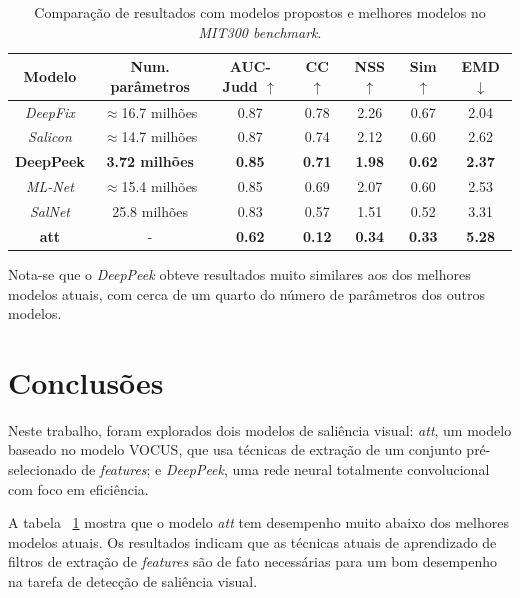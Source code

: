 \documentclass[11pt]{article}
\newcommand{\tit}[1]{\textit{#1}}
\begin{document}
\begin{table}[!htb]
	\small
    \centering
    \label{table:results}
    \caption{Comparação de resultados com modelos propostos e melhores
        modelos no \emph{MIT300 benchmark}.}
    \begin{tabular}{|c|c|c|c|c|c|c|}
        \hline
        Modelo & Num. parâmetros & AUC-Judd $\uparrow$ & CC $\uparrow$
            & NSS $\uparrow$ & Sim $\uparrow$ & EMD $\downarrow$\\
        \hline
        \emph{DeepFix} & $\approx$16.7 milhões & 0.87 & 0.78
            & 2.26 & 0.67 & 2.04\\
        \hline
        \emph{Salicon} & $\approx$14.7 milhões & 0.87 & 0.74 & 2.12
            & 0.60 & 2.62\\
        \hline
        \textbf{DeepPeek} & \textbf{3.72 milhões} & \textbf{0.85} &
        \textbf{0.71} & \textbf{1.98} & \textbf{0.62} & \textbf{2.37}\\
        \hline
        \emph{ML-Net} & $\approx$15.4 milhões & 0.85 & 0.69 & 2.07 & 0.60
            & 2.53\\
        \hline
        \emph{SalNet} & 25.8 milhões & 0.83 & 0.57 & 1.51 & 0.52 & 3.31\\
        \hline
        \textbf{att} & - & \textbf{0.62} &
        \textbf{0.12} & \textbf{0.34} & \textbf{0.33} & \textbf{5.28}\\
        \hline
    \end{tabular}
\end{table}

Nota-se que o \tit{DeepPeek} obteve resultados muito similares aos dos
melhores modelos atuais, com cerca de um quarto do número de parâmetros dos
outros modelos.

\section{Conclusões}
Neste trabalho, foram explorados dois modelos de saliência visual:
\tit{att}, um modelo baseado no modelo VOCUS,
que usa técnicas de extração de um conjunto pré-selecionado de \tit{features};
e \tit{DeepPeek}, uma rede neural totalmente convolucional com foco em
eficiência.

A tabela ~\ref{table:results} mostra que o modelo \tit{att} tem desempenho
muito abaixo dos melhores modelos atuais.
Os resultados indicam que as técnicas atuais de aprendizado
de filtros de extração de \tit{features} são de fato necessárias para
um bom desempenho na tarefa de detecção de saliência visual.
\end{document}

